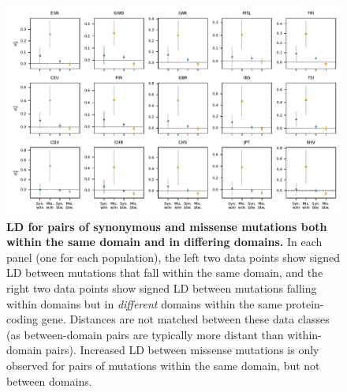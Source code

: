 \documentclass[]{article}
\begin{document}
\begin{figure}[ht!]
    \centering
    \includegraphics[width=\textwidth]{../figures/data_within_between}
    \caption{
        \textbf{LD for pairs of synonymous and missense mutations both within the same
        domain and in differing domains.}
        In each panel (one for each population), the left two data points show signed
        LD between mutations that fall within the same domain, and the right two
        data points show signed LD between mutations falling within domains but
        in \emph{different} domains within the same protein-coding gene. Distances
        are not matched between these data classes (as between-domain pairs are
        typically more distant than within-domain pairs). Increased LD between
        missense mutations is only observed for pairs of mutations within the same
        domain, but not between domains.
    }
    \label{fig:between_domains}
\end{figure}
\end{document}
